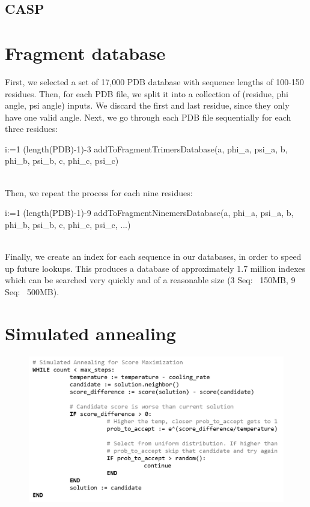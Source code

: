 \documentclass{article}
\begin{document}
\subsection{CASP}

\section{Fragment database}

First, we selected a set of 17,000 PDB database with sequence lengths of 100-150 residues.  Then, for each PDB file, we split it into a collection of (residue, phi angle, psi angle) inputs.  We discard the first and last residue, since they only have one valid angle.  Next, we go through each PDB file sequentially for each three residues:
\begin{program}

  \FOR i:=1 \TO (length(PDB)-1)-3  \DO
     	addToFragmentTrimersDatabase(a, phi_a, psi_a, b, phi_b, psi_b, c, phi_c, psi_c)\\\\
\END
\end{program}

Then, we repeat the process for each nine residues:

\begin{program}
  \FOR i:=1 \TO (length(PDB)-1)-9  \DO
	addToFragmentNinemersDatabase(a, phi_a, psi_a, b, phi_b, psi_b, c, phi_c, psi_c, ...)\\\\
\END
\end{program}

Finally, we create an index for each sequence in our databases, in order to speed up future lookups.  This produces a database of approximately 1.7 million indexes which can be searched very quickly and of a reasonable size (3 Seq: ~150MB, 9 Seq: ~500MB).

\section{Simulated annealing}


\begin{figure}[H]
\begin{center}
\includegraphics[width=\textwidth]{sa}
\label{Fig:blosum}
\end{center}
\end{figure}
\end{document}
